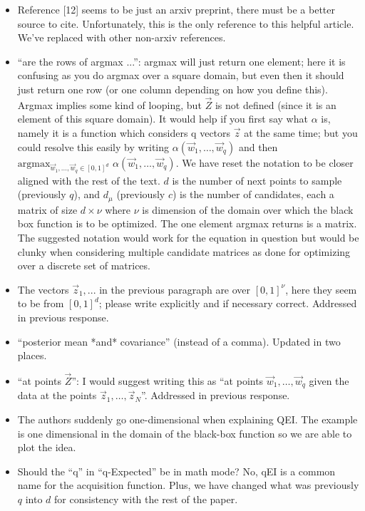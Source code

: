\documentclass{article}[12pt]
\newcommand{\Referee}[1]{{\color{blue} #1 \newline}}
\begin{document}
\begin{itemize}
    \item \Referee{Reference [12] seems to be just an arxiv preprint, there must be a better source to cite.}Unfortunately, this is the only reference to this helpful article. We've replaced with other non-arxiv references.
    \item \Referee{``are the rows of argmax ...'': argmax will just return one element; here it is confusing as you do argmax over a square domain, but even then it should just return one row (or one column depending on how you define this). Argmax implies some kind of looping, but $\vec{Z}$ is not defined (since it is an element of this square domain). It would help if you first say what $\alpha$ is, namely it is a function which considers q vectors $\vec{z}$ at the same time; but you could resolve this easily by writing $\alpha(\vec{w}_1, \ldots,\vec{w}_q)$ and then $\mathrm{argmax}_{\vec{w}_1,\ldots,\vec{w}_q \in [0, 1]^d}$ $\alpha(\vec{w}_1, \ldots, \vec{w}_q)$.}We have reset the notation to be closer aligned with the rest of the text. $d$ is the number of next points to sample (previously $q$), and $d_\mu$ (previously $c$) is the number of candidates, each a matrix of size $d \times \nu$ where $\nu$ is dimension of the domain over which the black box function is to be optimized. The one element argmax returns is a matrix. The suggested notation would work for the equation in question but would be clunky when considering multiple candidate matrices as done for optimizing over a discrete set of matrices. 
    \item \Referee{The vectors $\vec{z}_1, ...$ in the previous paragraph are over $[0, 1]^\nu$, here they seem to be from $[0, 1]^d$; please write explicitly and if necessary correct.}Addressed in previous response. 
    \item \Referee{``posterior mean *and* covariance'' (instead of a comma).}Updated in two places. 
    \item \Referee{``at points $\vec{Z}$'': I would suggest writing this as ``at points $\vec{w}_1,\ldots,\vec{w}_q$ given the data at the points $\vec{z}_1,\ldots,\vec{z}_N$''.}Addressed in previous response.
    \item \Referee{The authors suddenly go one-dimensional when explaining QEI.}The example is one dimensional in the domain of the black-box function so we are able to plot the idea.
    \item \Referee{Should the ``q'' in ``q-Expected'' be in math mode?}No, qEI is a common name for the acquisition function. Plus, we have changed what was previously $q$ into $d$ for consistency with the rest of the paper. 

\end{itemize}
\end{document}
